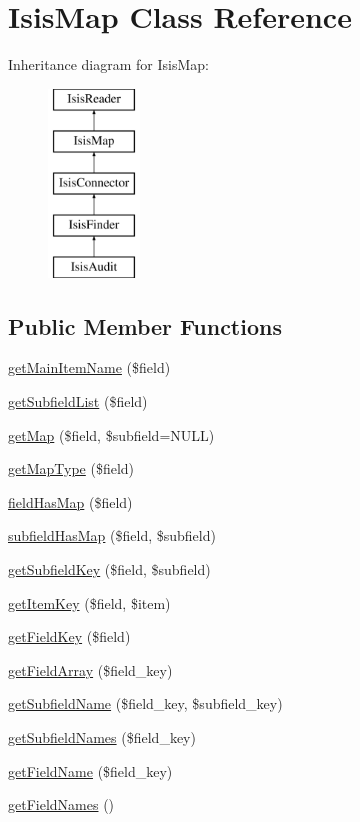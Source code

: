 \hypertarget{classIsisMap}{
\section{IsisMap Class Reference}
\label{classIsisMap}
}
Inheritance diagram for IsisMap:\begin{figure}[H]
\begin{center}
\leavevmode
\includegraphics[height=5cm]{classIsisMap}
\end{center}
\end{figure}
\subsection*{Public Member Functions}
\begin{DoxyCompactItemize}
\item 
\hyperlink{classIsisMap_af689f27e67b0b38a3e880ead17a487f5}{getMainItemName} (\$field)
\item 
\hyperlink{classIsisMap_ad0b61ec2fbfb011db4bf89c5f54efab4}{getSubfieldList} (\$field)
\item 
\hyperlink{classIsisMap_a29eb2c45b51f95fdfb9ff7af770ca6ce}{getMap} (\$field, \$subfield=NULL)
\item 
\hyperlink{classIsisMap_a62b933be483fb6704e12e41f10286cd5}{getMapType} (\$field)
\item 
\hyperlink{classIsisMap_af94e1fc5d73a6272f04a60c0acaeb409}{fieldHasMap} (\$field)
\item 
\hyperlink{classIsisMap_ab5493af644e529c11a3c3e6edc37c3b9}{subfieldHasMap} (\$field, \$subfield)
\item 
\hyperlink{classIsisMap_ae5d904b8407b38751656715fb9efd7cf}{getSubfieldKey} (\$field, \$subfield)
\item 
\hyperlink{classIsisMap_a994934784caa4149737bda55160a459f}{getItemKey} (\$field, \$item)
\item 
\hyperlink{classIsisMap_ac6a4eed048ddfa62c76e6d813754af81}{getFieldKey} (\$field)
\item 
\hyperlink{classIsisMap_aee1953b6e46b1612c725b2da82414d14}{getFieldArray} (\$field\_\-key)
\item 
\hyperlink{classIsisMap_a83ffdd84c385513a09e5ab523a44d6f2}{getSubfieldName} (\$field\_\-key, \$subfield\_\-key)
\item 
\hyperlink{classIsisMap_a1f30d131831b036271b0a1ff6d5d9d68}{getSubfieldNames} (\$field\_\-key)
\item 
\hyperlink{classIsisMap_ae41313537e399f15ff16a4db887cf5b9}{getFieldName} (\$field\_\-key)
\item 
\hyperlink{classIsisMap_a157fffbdb6c533a66e3f73674bfd8ea4}{getFieldNames} ()
\end{DoxyCompactItemize}
